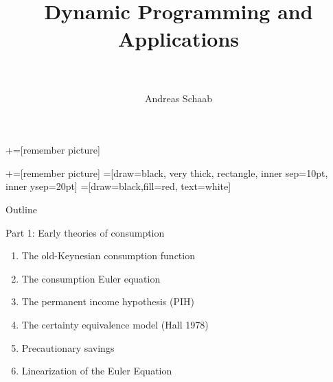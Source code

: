 \documentclass[11pt, aspectratio=169]{beamer}
\title[]{\\[8pt]
	{\large \color{blue} Dynamic Programming and Applications \\[5pt] \normalfont{Consumption} \\[10pt] \normalfont{Lectures 7--8}}}
\author[Schaab]{Andreas Schaab}
\institute{}
\date{}
\begin{document}
+=[remember picture]

\newcommand\marktopleft[1]{%
	\tikz[overlay,remember picture] 
	\node (marker-#1-a) at (-.3em,.3em) {};%
}
\newcommand\markbottomright[2]{%
	\tikz[overlay,remember picture] 
	\node (marker-#1-b) at (0em,0em) {};%
}
+=[remember picture] 
 =[draw=black, very thick, rectangle, inner sep=10pt, inner ysep=20pt]
 =[draw=black,fill=red, text=white]


\addtocounter{framenumber}{-1}
\thispagestyle{empty}
\maketitle 
\newpage



\begin{frame}{Outline}
\thispagestyle{empty}
\addtocounter{framenumber}{-1}

Part 1: Early theories of consumption
\begin{enumerate}
\item The old-Keynesian consumption function

\item The consumption Euler equation

\item The permanent income hypothesis (PIH)

\item The certainty equivalence model (Hall 1978)

\item Precautionary savings 

\item Linearization of the Euler Equation

\end{enumerate}

\end{frame}
\end{document}
